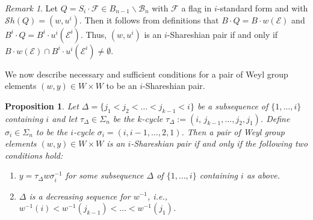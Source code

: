 \documentclass[12pt]{amsart}
\numberwithin{equation}{section}
\newtheorem{prop}[thm]{Proposition}
\theoremstyle{remark}
\newtheorem{rem}[thm]{Remark}
\theoremstyle{definition}
\newcommand{\B}{\mathcal{B}}
\newcommand{\F}{\mathcal{F}}
\newcommand{\Borbitspace}{B_{n-1}\backslash\B_{n}}
\newcommand{\Sh}{\mathcal{S}h}
\begin{document}
\begin{rem}\label{r:starandtildeflags}
Let $Q=S_{i}\cdot \F\in\Borbitspace$ with $\F$ a flag in $i$-standard form and with $\Sh(Q)=(w, u^{i})$.  Then it follows from definitions that $B\cdot Q=B\cdot w(\mathcal{E})$ and $B^{i}\cdot Q=B^{i}\cdot u^{i}(\mathcal{E}^{i})$. Thus, $(w,u^{i})$ is an $i$-Shareshian pair if and only if $B\cdot w(\mathcal{E})\cap B^{i}\cdot u^{i}(\mathcal{E}^{i})\neq\emptyset$.


\end{rem}

We now describe necessary and sufficient conditions for a pair of Weyl group 
elements $(w,y)\in W\times W$ to be an $i$-Shareshian pair.  



\begin{prop}\label{p:Shpairs}
Let $\Delta=\{j_{1}<j_{2}<\dots<j_{k-1}<i\}$ be a subsequence of $\{1,\dots,i\}$ 
containing $i$ and let $\tau_{\Delta}\in \Sigma_{n}$ be the $k$-cycle
$\tau_{\Delta}:=(i,\, j_{k-1}, \dots, j_{2}, j_{1})$.  Define $\sigma_{i}\in\Sigma_{n}$ to be 
the $i$-cycle $\sigma_{i}=(i,i-1,\dots, 2,1)$.  Then a pair of Weyl group elements 
$(w, y)\in W\times W$ is an $i$-Shareshian pair if and only if the following two conditions hold: 
\begin{enumerate}
\item $y=\tau_{\Delta}w\sigma_{i}^{-1}$ for some subsequence $\Delta$ of $\{1,\dots, i\}$ containing $i$ as above.
\item $\Delta$ is a decreasing sequence for $w^{-1}$, i.e., $w^{-1}(i)<w^{-1}(j_{k-1})<\dots <w^{-1}(j_{1})$.
\end{enumerate}
\end{prop}
\end{document}
